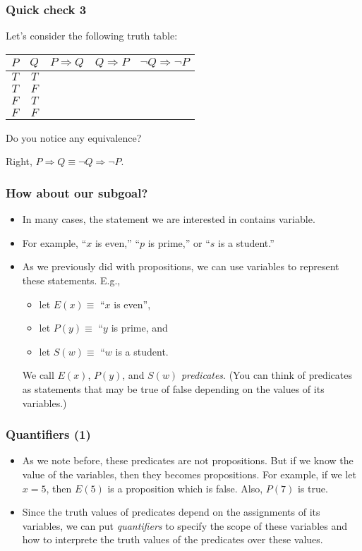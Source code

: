 \begin{frame}\frametitle{Quick check 3}
  Let's consider the following truth table:
  \begin{tcolorbox}
    \begin{tabular}{|c|c||c|c|c|}
      \hline
      $P$ & $Q$ & $P\Rightarrow Q$ & $Q\Rightarrow P$ & $\neg Q \Rightarrow \neg P$ \\
      \hline
      $T$ & $T$ & & & \\
      $T$ & $F$ & & & \\
      $F$ & $T$ & & & \\
      $F$ & $F$ & & & \\
      \hline
    \end{tabular}
  \end{tcolorbox}
  \pause
  Do you notice any equivalence?
  \pause

  Right, $P\Rightarrow Q\equiv \neg Q\Rightarrow\neg P$.
\end{frame}

\begin{frame}\frametitle{How about our subgoal?}
  \begin{itemize}
  \item
    In many cases, the statement we are interested in contains variable.

  \item
    For example, ``$x$ is even,'' ``$p$ is prime,'' or ``$s$ is a student.''
    \pause

  \item
    As we previously did with propositions, we can use variables to
    represent these statements.  E.g.,
    \begin{itemize}
    \item let $E(x)\equiv$ ``$x$ is even'',
    \item let $P(y)\equiv$ ``$y$ is prime, and
    \item let $S(w)\equiv$ ``$w$ is a student.
    \end{itemize}
    We call $E(x)$, $P(y)$, and $S(w)$ {\em predicates}. (You can
    think of predicates as statements that may be true of false
    depending on the values of its variables.)
  \end{itemize}
\end{frame}

\begin{frame}\frametitle{Quantifiers (1)}
  \begin{itemize}
  \item As we note before, these predicates are not propositions.  But
    if we know the value of the variables, then they becomes
    propositions.  For example, if we let $x=5$, then $E(5)$ is a
    proposition which is false.  Also, $P(7)$ is true.
  \item Since the truth values of predicates depend on the assignments
    of its variables, we can put {\em quantifiers} to specify the
    scope of these variables and how to interprete the truth values of
    the predicates over these values.
  \end{itemize}
\end{frame}

